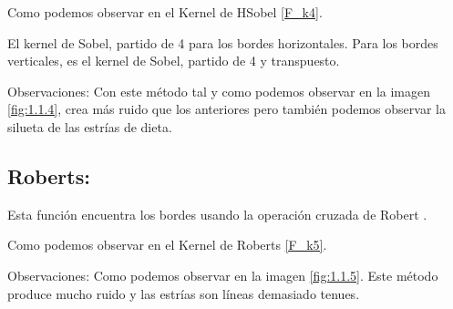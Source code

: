 Como podemos observar en el Kernel de HSobel \ref{F_k4}.


El kernel de Sobel, partido de 4 para los bordes horizontales.
Para los bordes verticales, es el kernel de Sobel, partido de 4 y transpuesto. 

Observaciones: 
Con este método tal y como podemos observar en la imagen \ref{fig:1.1.4}, crea más ruido que los anteriores pero también podemos observar la silueta de las estrías de dieta.


\subsection{Roberts:}

Esta función encuentra los bordes usando la operación cruzada de Robert \cite{wiki:Roberts}.

Como podemos observar en el Kernel de Roberts \ref{F_k5}.




Observaciones:
Como podemos observar en la imagen \ref{fig:1.1.5}.
Este método produce mucho ruido y las estrías son líneas demasiado tenues.

